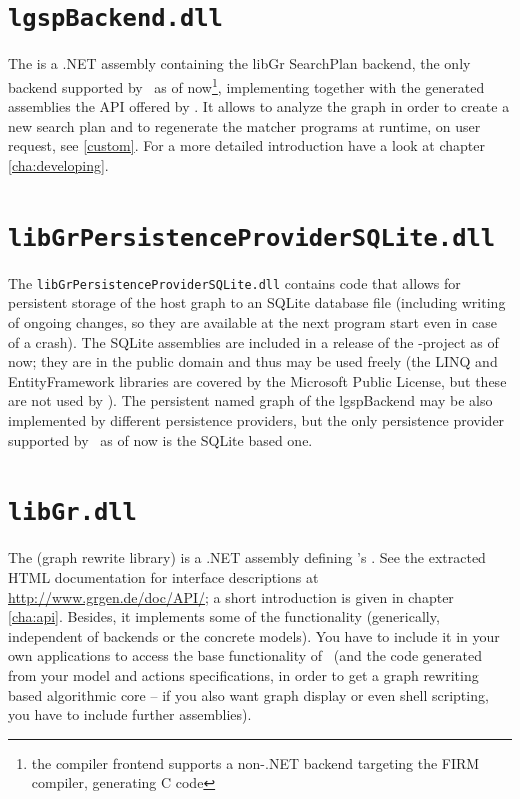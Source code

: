 \section{\texttt{lgspBackend.dll}}
The \LGSPBackend{} is a .NET assembly containing the libGr SearchPlan backend, the only backend supported by \GrG~as of now\footnote{the compiler frontend supports a non-.NET backend targeting the FIRM compiler, generating C code}, implementing together with the generated assemblies the API offered by \LibGr.
It allows to analyze the graph in order to create a new search plan and to regenerate the matcher programs at runtime, on user request, see \ref{custom}.
For a more detailed introduction have a look at chapter \ref{cha:developing}.

\section{\texttt{libGrPersistenceProviderSQLite.dll}}
The \texttt{libGrPersistenceProviderSQLite.dll} contains code that allows for persistent storage of the host graph to an SQLite database file (including writing of ongoing changes, so they are available at the next program start even in case of a crash).
The SQLite assemblies are included in a release of the \GrG-project as of now; they are in the public domain and thus may be used freely (the LINQ and EntityFramework libraries are covered by the Microsoft Public License, but these are not used by \GrG).
The persistent named graph of the lgspBackend may be also implemented by different persistence providers, but the only persistence provider supported by \GrG~as of now is the SQLite based one.

\section{\texttt{libGr.dll}}
\label{sct:API}
The \LibGr{} (graph rewrite library) is a .NET assembly defining \GrG's .
See the extracted HTML documentation for interface descriptions at \url{http://www.grgen.de/doc/API/};
a short introduction is given in chapter \ref{cha:api}.
Besides, it implements some of the functionality (generically, independent of backends or the concrete models).
You have to include it in your own applications to access the base functionality of \GrG\ (and the code generated from your model and actions specifications, in order to get a graph rewriting based algorithmic core -- if you also want graph display or even shell scripting, you have to include further assemblies).

